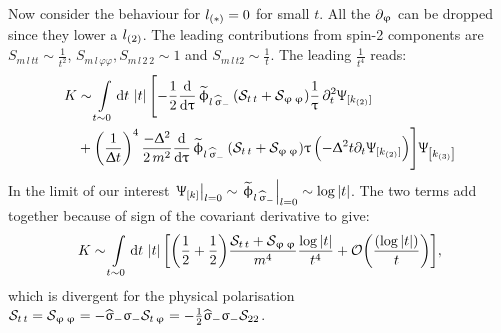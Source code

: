 Now consider the behaviour for $l_{\qty(*)} = 0$ for small $t$.
All the $\partial_{\upvarphi}$ can be dropped since they lower a $l_{\qty(2)}$.
The leading contributions from spin-2 components are $S_{m\, l\, t t} \sim \frac{1}{t^2}$, $S_{m\, l\, \varphi \varphi}, S_{m\, l\, 2\,2} \sim 1$ and $S_{m\, l\, t 2} \sim \frac{1}{t}$.
The leading $\frac{1}{t^4}$ reads:
\begin{equation}
  \begin{split}
    K
    & \sim
    \int\limits_{t \sim 0} \dd{t}\,
    \abs{t}\,
    \Biggl[
      -
      \frac{1}{2}
      \dv{\ensuremath{\uptau}}\,
      \widetilde{\upphi}_{l\, \widehat{\upsigma}_-}\,
      \qty( \mathcal{S}_{t\,t} + \mathcal{S}_{\upvarphi\,\upvarphi} )
      \frac{1}{\uptau}\,
      \partial_{t}^2 \Uppsi_{ [k_{\qty(2)}] }
      \\
      & +
      \qty(\frac{1}{\Updelta t})^4\,
      \frac{-\Updelta^2}{2\,m^2}
      \dv{\ensuremath{\uptau}}\,
      \widetilde{\upphi}_{l\, \widehat{\upsigma}_-}\,
      \qty( \mathcal{S}_{t\,t} + \mathcal{S}_{\upvarphi\,\upvarphi} )
      \uptau\,
      \qty( - \Updelta^2 t \partial_{t} \Uppsi_{ [k_{\qty(2)}] })
    \Biggr]
    \Uppsi_{ \qty[k_{\qty(3)}] }
  \end{split}
\end{equation}
In the limit of our interest $\eval{\Psi_{ \qty[k] }}_{l = 0} \sim \eval {\tphi_{\lsi}}_{l = 0} \sim \log\abs{t}$.
The two terms add together because of sign of the covariant derivative to give:
\begin{equation}
  K
  \sim
  \int\limits_{t \sim 0} \dd{t}\, \abs{t}\,
  \qty[
    \qty( \frac{1}{2} + \frac{1}{2} )
    \frac{\cS_{t\,t} + \cS_{\varphi\,\varphi}}{ m^4}
    \frac{\log\abs{t}}{t^4}
    +
    \order{\frac{\qty(\log\abs{t})}{t}}
  ],
\end{equation}
which is divergent for the physical polarisation $\mathcal{S}_{t\,t} = \mathcal{S}_{\upvarphi\,\upvarphi} = -\widehat{\upsigma}_- \upsigma_- \mathcal{S}_{t\,\upvarphi} = -\frac{1}{2} \widehat{\upsigma}_- \upsigma_- \mathcal{S}_{2 2}$.
  

